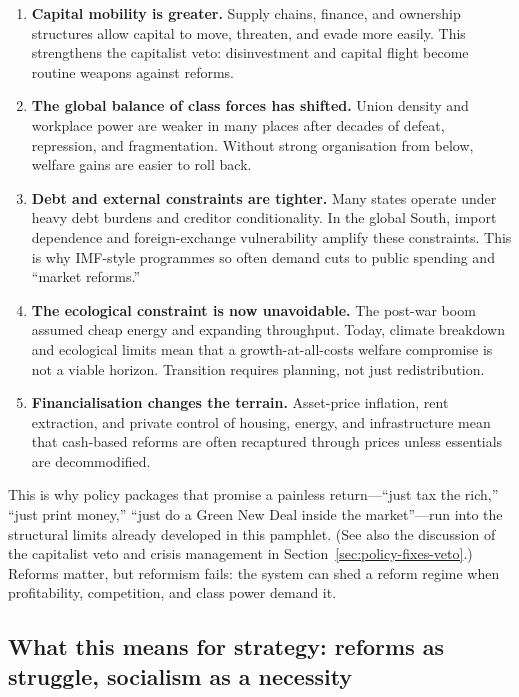 \begin{enumerate}[leftmargin=1.5em]
  \item \textbf{Capital mobility is greater.} Supply chains, finance, and ownership structures allow capital to move,
  threaten, and evade more easily. This strengthens the capitalist veto: disinvestment and capital flight become routine
  weapons against reforms.

  \item \textbf{The global balance of class forces has shifted.} Union density and workplace power are weaker in many
  places after decades of defeat, repression, and fragmentation. Without strong organisation from below, welfare gains
  are easier to roll back.

  \item \textbf{Debt and external constraints are tighter.} Many states operate under heavy debt burdens and creditor
  conditionality. In the global South, import dependence and foreign-exchange vulnerability amplify these constraints.
  This is why IMF-style programmes so often demand cuts to public spending and ``market reforms.''

  \item \textbf{The ecological constraint is now unavoidable.} The post-war boom assumed cheap energy and expanding
  throughput. Today, climate breakdown and ecological limits mean that a growth-at-all-costs welfare compromise is not
  a viable horizon.\cite{IPCCAR6WGIII} Transition requires planning, not just redistribution.

  \item \textbf{Financialisation changes the terrain.} Asset-price inflation, rent extraction, and private control of
  housing, energy, and infrastructure mean that cash-based reforms are often recaptured through prices unless essentials
  are decommodified.
\end{enumerate}

This is why policy packages that promise a painless return—``just tax the rich,'' ``just print money,'' ``just do a Green
New Deal inside the market''—run into the structural limits already developed in this pamphlet. (See also the discussion
of the capitalist veto and crisis management in Section~\ref{sec:policy-fixes-veto}.) Reforms matter, but
reformism fails: the system can shed a reform regime when profitability, competition, and class power demand it.

\subsection{What this means for strategy: reforms as struggle, socialism as a necessity}
\label{subsec:strategy-reforms-socialism}

